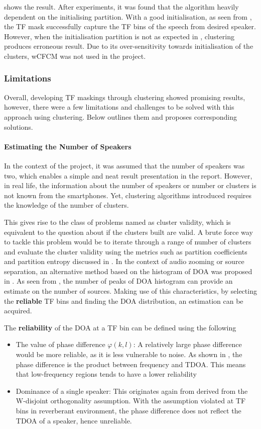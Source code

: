 \documentclass[a4paper,twoside,12pt,hidelinks]{article}
\begin{document}
 shows the result. After experiments, it was found that the algorithm heavily dependent on the initialising partition. With a good initialisation, as seen from , the TF mask successfully capture the TF bins of the speech from desired speaker. However, when the initialisation partition is not as expected in , clustering produces erroneous result. Due to its over-sensitivity towards initialisation of the clusters, wCFCM was not used in the project.

\subsubsection{Limitations}
Overall, developing TF maskings through clustering showed promising results, however, there were a few limitations and challenges to be solved with this approach using clustering. Below outlines them and proposes corresponding solutions.

\paragraph{Estimating the Number of Speakers}
In the context of the project, it was assumed that the number of speakers was two, which enables a simple and neat result presentation in the report. However, in real life, the information about the number of speakers or number or clusters is not known from the smartphones. Yet, clustering algorithms introduced requires the knowledge of the number of clusters.

This gives rise to the class of problems named as cluster validity, which is equivalent to the question about if the clusters built are valid.  A brute force way to tackle this problem would be to iterate through a range of number of clusters and evaluate the cluster validity using the metrics such as partition coefficients and partition entropy discussed in \cite{Pal1995OnModel}. In the context of audio zooming or source separation, an alternative method based on the histogram of DOA was proposed in \cite{Loesch2008SourceSeparation}. As seen from , the number of peaks of DOA histogram can provide an estimate on the number of sources. Making use of this characteristics, by selecting the \textbf{reliable} TF bins and finding the DOA distribution, an estimation can be acquired. 

The \textbf{reliability} of the DOA at a TF bin can be defined using the following
\begin{itemize}
\item The value of phase difference $\varphi(k,l)$: A relatively large phase difference would be more reliable, as it is less vulnerable to noise. As shown in , the phase difference is the product between frequency and TDOA. This means that low-frequency regions tends to have a lower reliability
\item Dominance of a single speaker: This originates again from  derived from the W-disjoint orthogonality assumption. With the assumption violated at TF bins in reverberant environment, the phase difference does not reflect the TDOA of a speaker, hence unreliable.
\end{itemize}
\end{document}
